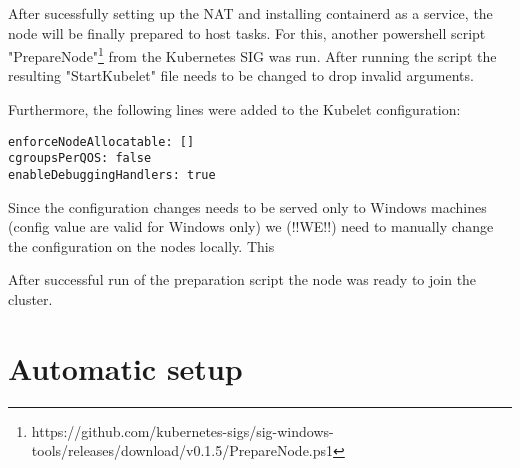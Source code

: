 After sucessfully setting up the \ac{NAT} and installing containerd as a service, the node will be finally prepared to host tasks. For this, another powershell script "PrepareNode"\footnote{https://github.com/kubernetes-sigs/sig-windows-tools/releases/download/v0.1.5/PrepareNode.ps1} from the Kubernetes \ac{SIG} was run. After running the script the resulting "StartKubelet" file needs to be changed to drop invalid arguments.

Furthermore, the following lines were added to the Kubelet configuration:
\begin{lstlisting}
enforceNodeAllocatable: []
cgroupsPerQOS: false
enableDebuggingHandlers: true
\end{lstlisting}
Since the configuration changes needs to be served only to Windows machines (config value are valid for Windows only) we (!!WE!!) need to manually change the configuration on the nodes locally. This


After successful run of the preparation script the node was ready to join the cluster.


\section{Automatic setup}



